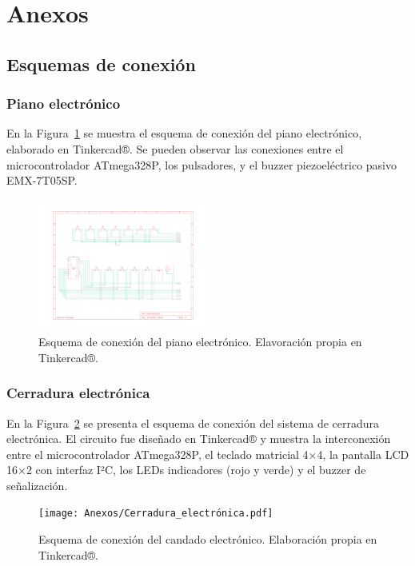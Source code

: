 \newpage

\section{Anexos}

\subsection{Esquemas de conexión}

\subsubsection{Piano electrónico}

En la Figura~\ref{fig:conexion_piano} se muestra el esquema de conexión del piano electrónico, elaborado en Tinkercad®. 
Se pueden observar las conexiones entre el microcontrolador ATmega328P, los pulsadores, y el buzzer piezoeléctrico pasivo EMX-7T05SP.

\begin{figure}[H]
    \centering
    \includegraphics[width=0.5\textwidth]{Anexos/Conexionado_de_piano.pdf}
    \caption{Esquema de conexión del piano electrónico. Elavoración propia en Tinkercad®.}
    \label{fig:conexion_piano}
\end{figure}

\subsubsection{Cerradura electrónica}

En la Figura~\ref{fig:Cerradura_electronica} se presenta el esquema de conexión del sistema de cerradura electrónica. 
El circuito fue diseñado en Tinkercad® y muestra la interconexión entre el microcontrolador ATmega328P, el teclado matricial 4×4, 
la pantalla LCD 16×2 con interfaz I²C, los LEDs indicadores (rojo y verde) y el buzzer de señalización.

\begin{figure}[H]
    \centering
    \texttt{[image: Anexos/Cerradura\_electrónica.pdf]}
    \caption{Esquema de conexión del candado electrónico. Elaboración propia en Tinkercad®.}
    \label{fig:Cerradura_electronica}
\end{figure}
